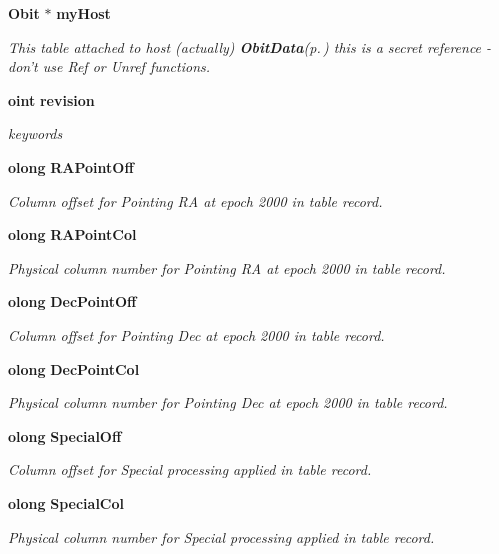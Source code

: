 \begin{CompactItemize}
{\bf Obit} $\ast$ {\bf my\-Host}
\begin{CompactList}\small\item\em This table attached to host (actually) {\bf Obit\-Data}{\rm (p.\,\pageref{structObitData})} this is a secret reference - don't use Ref or Unref functions. \item\end{CompactList}\item 
{\bf oint} {\bf revision}
\begin{CompactList}\small\item\em keywords \item\end{CompactList}\item 
{\bf olong} {\bf RAPoint\-Off}
\begin{CompactList}\small\item\em Column offset for Pointing RA at epoch 2000 in table record. \item\end{CompactList}\item 
{\bf olong} {\bf RAPoint\-Col}
\begin{CompactList}\small\item\em Physical column number for Pointing RA at epoch 2000 in table record. \item\end{CompactList}\item 
{\bf olong} {\bf Dec\-Point\-Off}
\begin{CompactList}\small\item\em Column offset for Pointing Dec at epoch 2000 in table record. \item\end{CompactList}\item 
{\bf olong} {\bf Dec\-Point\-Col}
\begin{CompactList}\small\item\em Physical column number for Pointing Dec at epoch 2000 in table record. \item\end{CompactList}\item 
{\bf olong} {\bf Special\-Off}
\begin{CompactList}\small\item\em Column offset for Special processing applied in table record. \item\end{CompactList}\item 
{\bf olong} {\bf Special\-Col}
\begin{CompactList}\small\item\em Physical column number for Special processing applied in table record. \item\end{CompactList}\item 

\end{CompactItemize}
